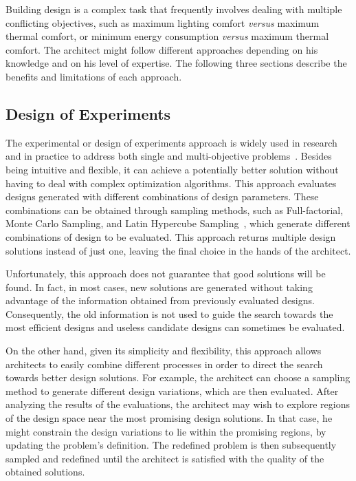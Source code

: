 	Building design is a complex task that frequently involves dealing with multiple conflicting objectives, such as maximum lighting comfort \textit{versus} maximum thermal comfort, or minimum energy consumption \textit{versus} maximum thermal comfort. The architect might follow different approaches depending on his knowledge and on his level of expertise. The following three sections describe the benefits and limitations of each approach. 
	
	\subsection{Design of Experiments}
	\label{ssec:doe}
	
	The experimental or design of experiments approach is widely used in research and in practice to address both single and multi-objective problems~\cite{Fang2017}. Besides being intuitive and flexible, it can achieve a potentially better solution without having to deal with complex optimization algorithms. This approach evaluates designs generated with different combinations of design parameters. These combinations can be obtained through sampling methods, such as Full-factorial, Monte Carlo Sampling, and Latin Hypercube Sampling~\cite{Giunta2003DOE}, which generate different combinations of design to be evaluated. This approach returns multiple design solutions instead of just one, leaving the final choice in the hands of the architect.
	
	Unfortunately, this approach does not guarantee that good solutions will be found. In fact, in most cases, new solutions are generated without taking advantage of the information obtained from previously evaluated designs. Consequently, the old information is not used to guide the search towards the most efficient designs and useless candidate designs can sometimes be evaluated. 
	
	On the other hand, given its simplicity and flexibility, this approach allows architects to easily combine different processes in order to direct the search towards better design solutions. For example, the architect can choose a sampling method to generate different design variations, which are then evaluated. After analyzing the results of the evaluations, the architect may wish to explore regions of the design space near the most promising design solutions. In that case, he might constrain the design variations to lie within the promising regions, by updating the problem’s definition. The redefined problem is then subsequently sampled and redefined until the architect is satisfied with the quality of the obtained solutions.
	
